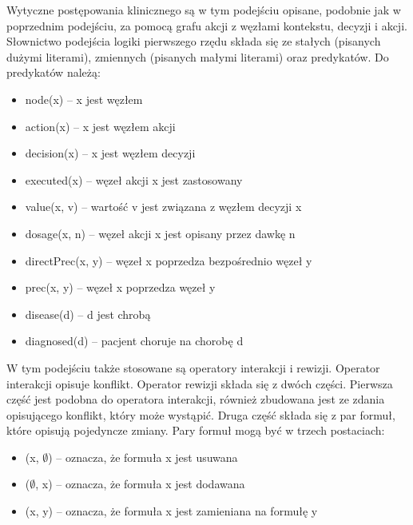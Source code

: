 Wytyczne postępowania klinicznego są w tym podejściu opisane, podobnie jak w poprzednim podejściu, za pomocą grafu akcji z węzłami kontekstu, decyzji i akcji.\cite{SzWilk} Słownictwo podejścia logiki pierwszego rzędu składa się ze stałych (pisanych dużymi literami), zmiennych (pisanych małymi literami) oraz predykatów. Do predykatów należą:
\begin{itemize}
\item{node(x) – x jest węzłem}
\item{action(x) – x jest węzłem akcji}
\item{decision(x) – x jest węzłem decyzji}
\item{executed(x) – węzeł akcji x jest zastosowany}
\item{value(x, v) – wartość v jest związana z węzłem decyzji x}
\item{dosage(x, n) – węzeł akcji x jest opisany przez dawkę n}
\item{directPrec(x, y) – węzeł x poprzedza bezpośrednio węzeł y}
\item{prec(x, y) – węzeł x poprzedza węzeł y}
\item{disease(d) – d jest chrobą}
\item{diagnosed(d) – pacjent choruje na chorobę d}
\end{itemize}
W tym podejściu także stosowane są operatory interakcji i rewizji. Operator interakcji opisuje konflikt. Operator rewizji składa się z dwóch części. Pierwsza część jest podobna do operatora interakcji, również zbudowana jest ze zdania opisującego konflikt, który może wystąpić. Druga część składa się z par formuł, które opisują pojedyncze zmiany. Pary formuł mogą być w trzech postaciach:
\begin{itemize}
\item{(x, $\emptyset$) – oznacza, że formuła x jest usuwana}
\item{($\emptyset$, x) – oznacza, że formuła x jest dodawana}
\item{(x, y) – oznacza, że formuła x jest zamieniana na formułę y}
\end{itemize}


